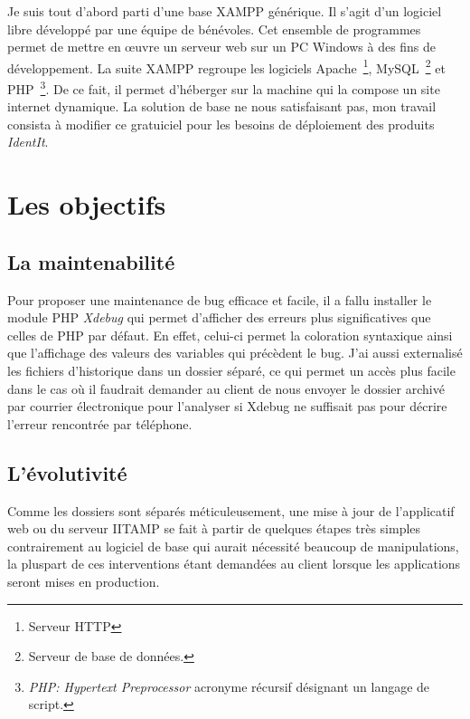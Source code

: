 Je suis tout d'abord parti d'une base XAMPP générique. Il s'agit d'un
logiciel libre développé par une équipe de bénévoles. Cet ensemble de
programmes permet de mettre en \oe{}uvre un serveur web sur un PC
Windows à des fins de développement. La suite XAMPP regroupe les
logiciels Apache\, \footnote{Serveur HTTP}, MySQL\, \footnote{Serveur de
base de données.} et PHP\, \footnote{\emph{PHP: Hypertext Preprocessor}
acronyme récursif désignant un langage de script.}. De ce fait, il
permet d'héberger sur la machine qui la compose un site internet
dynamique. La solution de base ne nous satisfaisant pas, mon travail
consista à modifier ce gratuiciel pour les besoins de déploiement des
produits \emph{IdentIt}.

\section{Les objectifs} %
\label{sec:Les objectifs}

\subsection{La maintenabilité} %
\label{sub:La maintenabilité}

Pour proposer une maintenance de bug efficace et facile, il a fallu
installer le module PHP \emph{Xdebug} qui permet d'afficher des erreurs
plus significatives que celles de PHP par défaut. En effet, celui-ci
permet la coloration syntaxique ainsi que l'affichage des valeurs des
variables qui précèdent le bug. J'ai aussi externalisé les fichiers
d'historique dans un dossier séparé, ce qui permet un accès plus facile
dans le cas où il faudrait demander au client de nous envoyer le dossier
archivé par courrier électronique pour l'analyser si Xdebug ne suffisait
pas pour décrire l'erreur rencontrée par téléphone.

\subsection{L'évolutivité} %
\label{sub:L'évolutivité}

Comme les dossiers sont séparés méticuleusement, une mise à jour de
l'applicatif web ou du serveur IITAMP se fait à partir de quelques
étapes très simples contrairement au logiciel de base qui aurait
nécessité beaucoup de manipulations, la pluspart de ces interventions
étant demandées au client lorsque les applications seront mises en
production.

